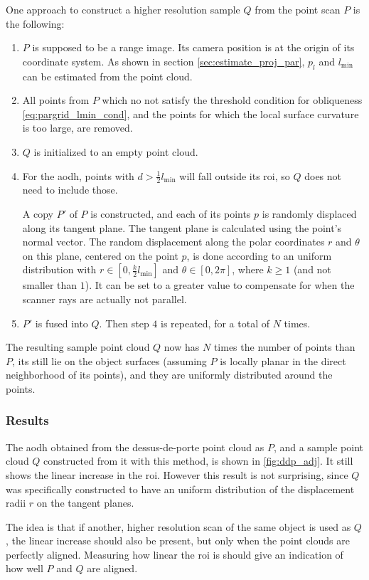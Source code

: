 One approach to construct a higher resolution sample $Q$ from the point scan $P$ is the following:
\begin{enumerate}
\item $P$ is supposed to be a range image. Its camera position is at the origin of its coordinate system. As shown in section \ref{sec:estimate_proj_par}, $p_l$ and $l_{\text{min}}$ can be estimated from the point cloud.
\item All points from $P$ which no not satisfy the threshold condition for obliqueness \ref{eq:pargrid_lmin_cond}, and the points for which the local surface curvature is too large, are removed.
\item $Q$ is initialized to an empty point cloud.
\item For the \gls{aodh}, points with $d > \frac{1}{2} l_{\text{min}}$ will fall outside its \gls{roi}, so $Q$ does not need to include those.

A copy $P'$ of $P$ is constructed, and each of its points $p$ is randomly displaced along its tangent plane. The tangent plane is calculated using the point's normal vector. The random displacement along the polar coordinates $r$ and $\theta$ on this plane, centered on the point $p$, is done according to an uniform distribution with  $r \in [0, \frac{k}{2} l_{\text{min}} ]$ and $\theta \in [0, 2 \pi]$, where $k \geq 1$ (and not smaller than $1$). It can be set to a greater value to compensate for when the scanner rays are actually not parallel.
\item $P'$ is fused into $Q$. Then step $4$ is repeated, for a total of $N$ times.
\end{enumerate}
The resulting sample point cloud $Q$ now has $N$ times the number of points than $P$, its still lie on the object surfaces (assuming $P$ is locally planar in the direct neighborhood of its points), and they are uniformly distributed around the points.

\subsubsection{Results}
The \gls{aodh} obtained from the dessus-de-porte point cloud as $P$, and a sample point cloud $Q$ constructed from it with this method, is shown in \ref{fig:ddp_adj}. It still shows the linear increase in the \gls{roi}. However this result is not surprising, since $Q$ was specifically constructed to have an uniform distribution of the displacement radii $r$ on the tangent planes.

The idea is that if another, higher resolution scan of the same object is used as $Q$, the linear increase should also be present, but only when the point clouds are perfectly aligned. Measuring how linear the \gls{roi} is should give an indication of how well $P$ and $Q$ are aligned.

